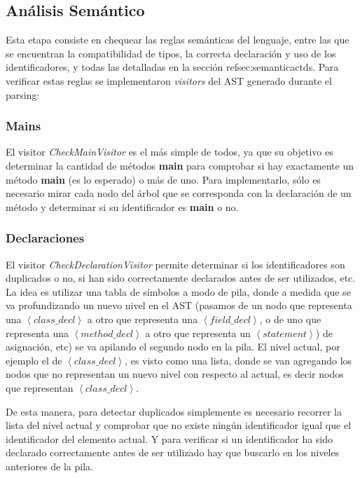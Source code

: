 \documentclass[11pt,a4paper]{article}
\begin{document}
\subsection{Análisis Semántico} 
\label{subsec:semantico}

Esta etapa consiste en chequear las reglas semánticas del lenguaje, entre las que se encuentran la compatibilidad de tipos, la correcta declaración y uso de los identificadores, y todas las detalladas en la sección ref{sec:semanticactds}. Para verificar estas reglas se implementaron \textit{visitors} del AST generado durante el parsing: 

\subsubsection{Mains}
\label{mains}
El visitor \textit{CheckMainVisitor} es el más simple de todos, ya que su objetivo es determinar la cantidad de métodos \textbf{main} para comprobar si hay exactamente un método \textbf{main} (es lo esperado) o más de uno. Para implementarlo, sólo es necesario mirar cada nodo del árbol que se corresponda con la declaración de un método y determinar si su identificador es \textbf{main} o no.
 
\subsubsection{Declaraciones}
\label{subsec:decls}

El visitor \textit{CheckDeclarationVisitor} permite determinar si los identificadores son duplicados o no, si han sido correctamente declarados antes de ser utilizados, etc. La idea es utilizar una tabla de símbolos a modo de pila, donde a medida que se va profundizando un nuevo nivel en el AST (pasamos de  un nodo que representa una $\left\langle class\_decl \right\rangle$ a otro que representa una $\left\langle field\_decl \right\rangle$, o de uno que representa una $\left\langle method\_decl \right\rangle$ a otro que representa un $\left\langle statement \right\rangle$) de asignación, etc) se va apilando el segundo nodo en la pila. El nivel actual, por ejemplo el de $\left\langle class\_decl \right\rangle$, es visto como una lista, donde se van agregando los nodos que no representan un nuevo nivel con respecto al actual, es decir nodos que representan $\left\langle class\_decl \right\rangle$. 

De esta manera, para detectar duplicados simplemente es necesario recorrer la lista del nivel actual y comprobar que no existe ningún identificador igual que el identificador del elemento actual. Y para verificar si un identificador ha sido declarado correctamente antes de ser utilizado hay que buscarlo en los niveles anteriores de la pila. 
\end{document}
